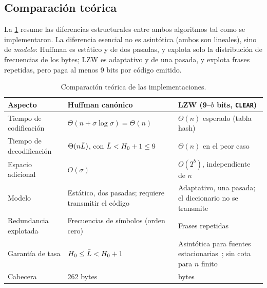 \subsection{Comparación teórica}
\label{sec:comparacion-teorica}
La \cref{tab:comparacion-teorica} resume las diferencias estructurales entre ambos
algoritmos tal como se implementaron. La diferencia esencial no es asintótica (ambos son
lineales), sino de \emph{modelo}: Huffman es estático y de dos pasadas, y explota solo la
distribución de frecuencias de los bytes; LZW es adaptativo y de una pasada, y explota
frases repetidas, pero paga al menos 9 bits por código emitido.

\begin{table}[H]
  \centering
  \caption{Comparación teórica de las implementaciones.}
  \label{tab:comparacion-teorica}
  \small
  \renewcommand{\arraystretch}{1.15}
  \begin{tabularx}{\linewidth}{@{}>{\raggedright}p{3.4cm} >{\raggedright}X >{\raggedright\arraybackslash}X@{}}
    \toprule
    Aspecto & Huffman canónico & LZW (9--$b$ bits, \texttt{CLEAR}) \\
    \midrule
    Tiempo de codificación & $\Theta(n + \sigma\log\sigma) = \Theta(n)$ & $\Theta(n)$ esperado (tabla hash) \\
    Tiempo de decodificación & $\Theta(n\bar{L})$, con $\bar{L} < H_0 + 1 \le 9$ & $\Theta(n)$ en el peor caso \\
    Espacio adicional & $O(\sigma)$ & $O(2^b)$, independiente de $n$ \\
    Modelo & Estático, dos pasadas; requiere transmitir el código & Adaptativo, una pasada; el diccionario no se transmite \\
    Redundancia explotada & Frecuencias de símbolos (orden cero) & Frases repetidas \\
    Garantía de tasa & $H_0 \le \bar{L} < H_0 + 1$ & Asintótica para fuentes estacionarias~\cite{ziv1978}; sin cota para $n$ finito \\
    Cabecera & 262 bytes & 7 bytes \\
    \bottomrule
  \end{tabularx}
\end{table}

